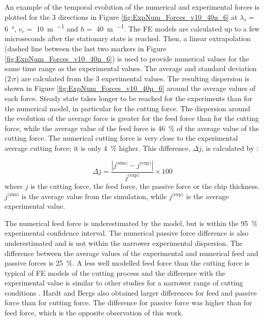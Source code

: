 \documentclass[preprint,12pt,times]{elsarticle}
\begin{document}
An example of the temporal evolution of the numerical and experimental forces is plotted for the 3 directions in Figure \ref{fig:ExpNum_Forces_v10_40µ_6} at $\lambda_s =$ \qty{6}{\degree}, $v_c =$ \qty{10}{\m\per\min} and $h =$ \qty{40}{\m\per\min}. The FE models are calculated up to a few microseconds after the stationary state is reached. Then, a linear extrapolation (dashed line between the last two markers in Figure \ref{fig:ExpNum_Forces_v10_40µ_6}) is used to provide numerical values for the same time range as the experimental values. The average and standard deviation ($2\,\sigma$) are calculated from the 3 experimental values. The resulting dispersion is shown in Figure \ref{fig:ExpNum_Forces_v10_40µ_6} around the average values of each force. Steady state takes longer to be reached for the experiments than for the numerical model, in particular for the cutting force. The dispersion around the evolution of the average force is greater for the feed force than for the cutting force, while the average value of the feed force is \qty{46}{\%} of the average value of the cutting force. The numerical cutting force is very close to the experimental average cutting force; it is only \qty{4}{\%} higher. This difference, $\Delta j$, is calculated by :

%
\begin{equation}\label{eq:diff}
\Delta j = \frac{\left|j^\text{(sim)} - j^\text{(exp)}\right|}{j^\text{(exp)}}\times 100
\end{equation}
%
where $j$ is the cutting force, the feed force, the passive force or the chip thickness. $j^\text{(sim)}$ is the average value from the simulation, while $j^\text{(exp)}$ is the average experimental value.

The numerical feed force is underestimated by the model, but is within the \qty{95}{\%} experimental confidence interval. The numerical passive force difference is also underestimated and is not within the narrower experimental dispersion. The difference between the average values of the experimental and numerical feed and passive forces is \qty{25}{\%}. A less well modelled feed force than the cutting force is typical of FE models of the cutting process and the difference with the experimental value is similar to other studies for a narrower range of cutting conditions \cite{sima_Modified_2010, ducobu_Material_2016, karpat_Temperature_2011, zhang_Chip_2011,afrasiabi_NumericalExperimental_2021}. Hardt and Bergs \cite{hardt_Three_2021} also obtained larger differences for feed and passive force than for cutting force. The difference for passive force was higher than for feed force, which is the opposite observation of this work.
\end{document}
